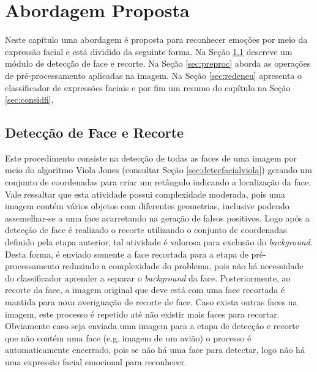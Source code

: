 \chapter{Abordagem Proposta}\label{sec:abordagemproposta}
Neste capítulo uma abordagem é proposta para reconhecer emoções por meio da expressão facial e está dividido da seguinte forma. Na Seção \ref{sec:detect} descreve um módulo de detecção de face e recorte. Na Seção \ref{sec:preproc} aborda as operações de pré-processamento aplicadas na imagem. Na Seção \ref{sec:redeneu} apresenta o classificador de expressões faciais e por fim um resumo do capítulo na Seção \ref{sec:considfi}.

\section{Detecção de Face e Recorte}\label{sec:detect}
Este procedimento consiste na detecção de todas as faces de uma imagem por meio do algoritmo Viola Jones (consultar Seção \ref{sec:detecfacialviola}) gerando um conjunto de coordenadas para criar um retângulo indicando a localização da face. Vale ressaltar que esta atividade possui complexidade moderada, pois uma imagem contém vários objetos com diferentes geometrias, inclusive podendo assemelhar-se a uma face acarretando na geração de falsos positivos. Logo após a detecção de face é realizado o recorte utilizando o conjunto de coordenadas definido pela etapa anterior, tal atividade é valorosa para exclusão do \textit{background}. Desta forma, é enviado somente a face recortada para a etapa de pré-processamento reduzindo a complexidade do problema, pois não há necessidade do classificador aprender a separar o \textit{background} da face. Posteriormente, ao recorte da face, a imagem original que deve está com uma face recortada é mantida para nova averiguação de recorte de face. Caso exista outras faces na imagem, este processo é repetido até não existir mais faces para recortar. Obviamente caso seja enviada uma imagem para a etapa de detecção e recorte que não contém uma face (e.g. imagem de um avião) o processo é automaticamente encerrado, pois se não há uma face para detectar, logo não há uma expressão facial emocional para reconhecer. 

